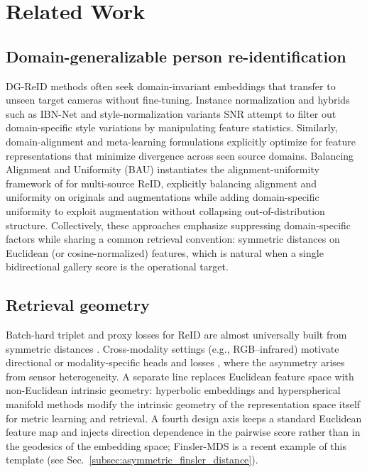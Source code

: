 \section{Related Work} \label{sec:relatedwork}
\subsection{Domain-generalizable person re-identification} \label{subsec:DG-ReID}
DG-ReID methods often seek domain-invariant embeddings that transfer to unseen target cameras without fine-tuning. Instance normalization and hybrids such as IBN-Net \cite{pan2018two} and style-normalization variants SNR \cite{jin2020style} attempt to filter out domain-specific style variations by manipulating feature statistics. Similarly, domain-alignment and meta-learning formulations \cite{song2019generalizable,choi2021meta} explicitly optimize for feature representations that minimize divergence across seen source domains. Balancing Alignment and Uniformity (BAU) \cite{cho2024generalizable} instantiates the alignment-uniformity framework of \citet{wang2020understanding} for multi-source ReID, explicitly balancing alignment and uniformity on originals and augmentations while adding domain-specific uniformity to exploit augmentation without collapsing out-of-distribution structure. Collectively, these approaches emphasize suppressing domain-specific factors while sharing a common retrieval convention: symmetric distances on Euclidean (or cosine-normalized) features, which is natural when a single bidirectional gallery score is the operational target.


\subsection{Retrieval geometry} \label{subsec:retrieval_geometry}
Batch-hard triplet and proxy losses for ReID are almost universally built from symmetric distances \cite{hermans2017defense}. Cross-modality settings (e.g., RGB–infrared) motivate directional or modality-specific heads and losses \cite{wu2017rgb}, where the asymmetry arises from sensor heterogeneity. A separate line replaces Euclidean feature space with non-Euclidean intrinsic geometry: hyperbolic embeddings \cite{khrulkov2020hyperbolic} and hyperspherical manifold methods \cite{fan2019spherereid} modify the intrinsic geometry of the representation space itself for metric learning and retrieval. A fourth design axis keeps a standard Euclidean feature map and injects direction dependence in the pairwise score rather than in the geodesics of the embedding space; Finsler-MDS \cite{dages2025finsler} is a recent example of this template (see Sec.~\ref{subsec:asymmetric_finsler_distance}).

